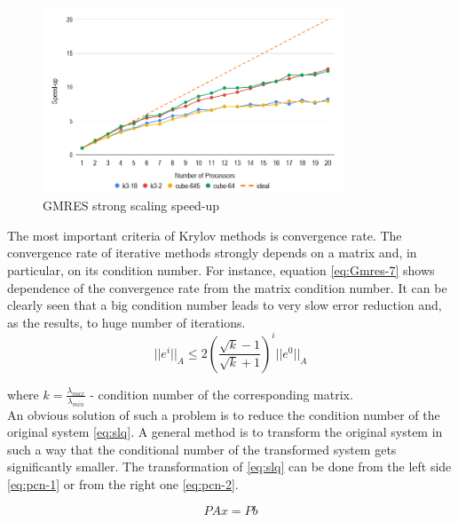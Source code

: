 \figpointer{\ref{fig:gmres-strong-scaling-speed-up}}
\begin{figure}[htpb]
  \centering
  \includegraphics[width=0.8\textwidth]{figures/chapter-2/gmres-strong-scaling-speedup.png}
\caption{GMRES strong scaling speed-up}
\label{fig:gmres-strong-scaling-speed-up}
\end{figure}



The most important criteria of Krylov methods is convergence rate. The convergence rate of iterative methods strongly depends on a matrix and, in particular, on its condition number. For instance, equation \ref{eq:Gmres-7} shows dependence of the convergence rate from the matrix condition number. It can be clearly seen that a big condition number leads to very slow error reduction and, as the results, to huge number of iterations.\\

\begin{equation} \label{eq:Gmres-7}
	|| e^i ||_A \leq 2 ( \frac{\sqrt k - 1}{\sqrt k + 1} )^i || e^0 ||_A
\end{equation}

where $k = \frac{\lambda_{max}}{\lambda_{min}}$ - condition number of the corresponding matrix. \\

An obvious solution of such a problem is to reduce the condition number of the original system \ref{eq:slq}. A general method is to transform the original system in such a way that the conditional number of the transformed system gets significantly smaller. The transformation of \ref{eq:slq} can be done from the left side \ref{eq:pcn-1} or from the right one \ref{eq:pcn-2}.

\begin{equation} \label{eq:pcn-1}
	PAx = Pb
\end{equation}


